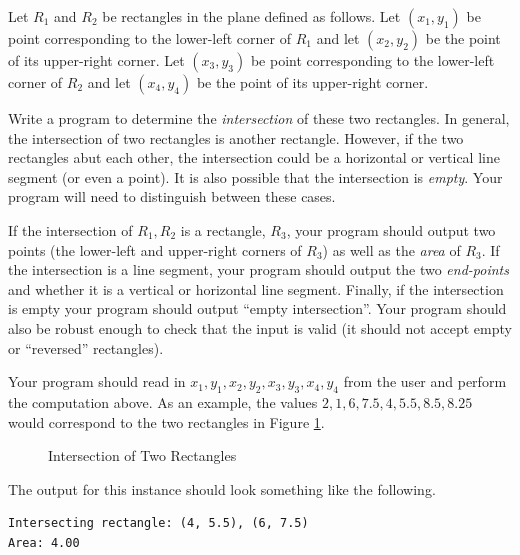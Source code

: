 \begin{exer}
Let $R_1$ and $R_2$ be rectangles in the plane defined as follows.  Let $(x_1, y_1)$ be
point corresponding to the lower-left corner of $R_1$ and let $(x_2, y_2)$ be the point of its
upper-right corner.  Let $(x_3, y_3)$ be point corresponding to the lower-left corner of $R_2$
and let $(x_4, y_4)$ be the point of its upper-right corner.

Write a program to determine the \emph{intersection} of these two rectangles.  In general,
the intersection of two rectangles is another rectangle.  However, if the two rectangles abut each
other, the intersection could be a horizontal or vertical line segment (or even a point).  It is also possible that the
intersection is \emph{empty}.  Your program will need to distinguish between these cases.

If the intersection of $R_1, R_2$ is a rectangle, $R_3$, your program should output two
points (the lower-left and upper-right corners of $R_3$) as well as the \emph{area} of $R_3$.
If the intersection is a line segment, your program should output the two \emph{end-points}
and whether it is a vertical or horizontal line segment.  Finally, if the intersection is empty your
program should output ``empty intersection''.  Your program should also be robust enough to
check that the input is valid (it should not accept empty or ``reversed'' rectangles).

Your program should read in $x_1, y_1, x_2, y_2, x_3, y_3, x_4, y_4$ from the user and
perform the computation above.  As an example, the values  $2, 1, 6, 7.5, 4, 5.5, 8.5, 8.25$
would correspond to the two rectangles in Figure \ref{fig:rectangleIntersection}.

\begin{figure}
\centering

\caption{Intersection of Two Rectangles}
\label{fig:rectangleIntersection}
\end{figure}

The output for this instance should look something like the following.

\begin{verbatim}
Intersecting rectangle: (4, 5.5), (6, 7.5)
Area: 4.00
\end{verbatim}
\end{exer}